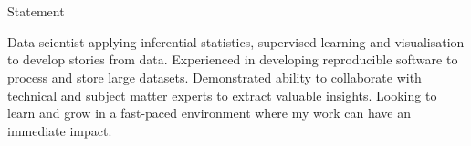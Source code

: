 \section{\faComment}{Statement}
 \vspace{3pt}
 \resumeEntryStart
  {\small Data scientist applying inferential statistics, supervised learning and visualisation to develop stories from data. Experienced in developing reproducible software to process and store large datasets. Demonstrated ability to collaborate with technical and subject matter experts to extract valuable insights. Looking to learn and grow in a fast-paced environment where my work can have an immediate impact.\par}
 \resumeEntryEnd
